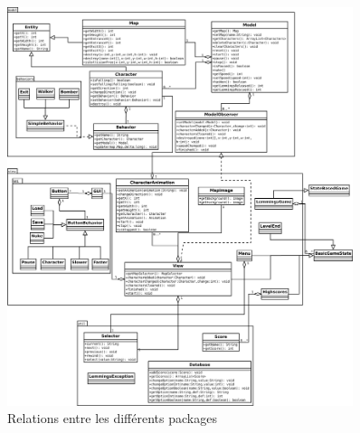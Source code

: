 \documentclass[a4paper,12pt]{article}
\begin{document}
\begin{figure}[ht!]
  \centerline{
  \includegraphics[width=0.9\textwidth]{relations.png}}
  \caption{Relations entre les différents packages}
  \label{fig:Relations}
\end{figure}
\end{document}
